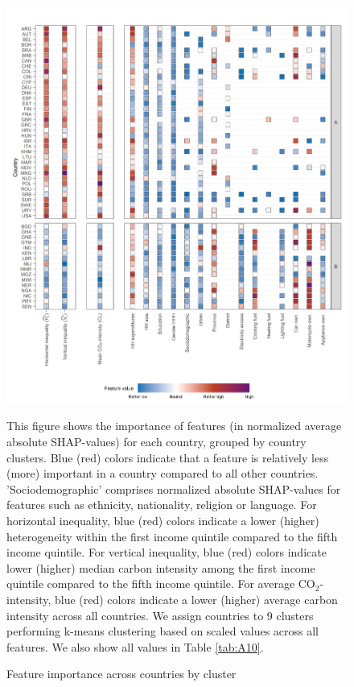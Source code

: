 \documentclass[12pt, a4paper]{article}
\newenvironment{subcaption}
{\strut
\vspace{-5pt}
\begin{minipage}[b]{0.9\textwidth}
  \hspace*{-\parindent}
  \footnotesize}
 {\end{minipage}}
\begin{document}
\begin{figure}[ht!]
    \centering
    \includegraphics{1_Figures/Figure 4/Figure_4_Corrected_1.jpg}
    \caption{Feature importance across countries by cluster}
    \label{fig:fig_4_1}
    \begin{subcaption}
    This figure shows the importance of features (in normalized average absolute SHAP-values) for each country, grouped by country clusters. Blue (red) colors indicate that a feature is relatively less (more) important in a country compared to all other countries. 'Sociodemographic' comprises normalized absolute SHAP-values for features such as ethnicity, nationality, religion or language.
    For horizontal inequality, blue (red) colors indicate a lower (higher) heterogeneity within the first income quintile compared to the fifth income quintile. For vertical inequality, blue (red) colors indicate lower (higher) median carbon intensity among the first income quintile compared to the fifth income quintile. For average CO$_{2}$-intensity, blue (red) colors indicate a lower (higher) average carbon intensity across all countries.
    We assign countries to 9 clusters performing k-means clustering based on scaled values across all features. We also show all values in Table \ref{tab:A10}.
    \end{subcaption}
\end{figure}
\end{document}
